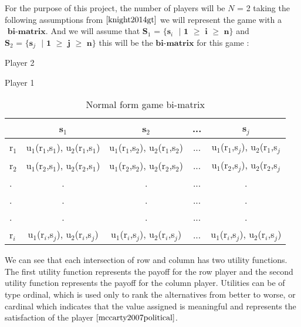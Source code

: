 For the purpose of this project, the number of players will be $\textit{N}$ = 2 taking the following assumptions from $\cite{knight2014gt}$ we will represent the game with a $\textbf{ bi-matrix}$. And we will assume that  $\textbf{S$_1$ = \{s$_i$ $|$ 1  $\geq$ i $\geq$ n\}}$ and $\textbf{S$_2$ = \{s$_j$ $|$ 1  $\geq$ j $\geq$ n\}}$ this will be the $\textbf{bi-matrix}$ for this game :
\begin{table}[h]
\begin{center}
Player 2

Player 1
\begin{tabular}{|l|c|c|c|c|}
\hline
& s$_1$ & s$_2$ & ... & s$_j$\\ 
\hline
r$_1$ & u$_1$(r$_1$,s$_1$), u$_2$(r$_1$,s$_1$) & u$_1$(r$_1$,s$_2$), u$_2$(r$_1$,s$_2$) & ... &  u$_1$(r$_1$,s$_j$), u$_2$(r$_1$,s$_j$\\
\hline
r$_2$ & u$_1$(r$_2$,s$_1$), u$_2$(r$_2$,s$_1$) & u$_1$(r$_2$,s$_2$), u$_2$(r$_2$,s$_2$) & ... &  u$_1$(r$_2$,s$_j$), u$_2$(r$_2$,s$_j$\\
\hline
. & . & . & ... & .\\
. & . & . & ... & .\\
. & . & . & ... & .\\
\hline
r$_i$ & u$_1$(r$_i$,s$_j$), u$_2$(r$_i$,s$_j$) & u$_1$(r$_i$,s$_j$), u$_2$(r$_i$,s$_j$) & ... &  u$_1$(r$_i$,s$_j$), u$_2$(r$_i$,s$_j$)\\
\hline
\end{tabular}
\caption{Normal form game bi-matrix}
\label{tab:normformgame}
\end{center}
\end{table}

We can see that each intersection of row and column has two utility functions. The first utility function represents the payoff for the row player and the second utility function represents the payoff for the column player. Utilities can be of type ordinal, which is used only to rank the alternatives from better to worse, or cardinal which indicates that the value assigned is meaningful and represents the satisfaction of the player $\cite{mccarty2007political}$.


